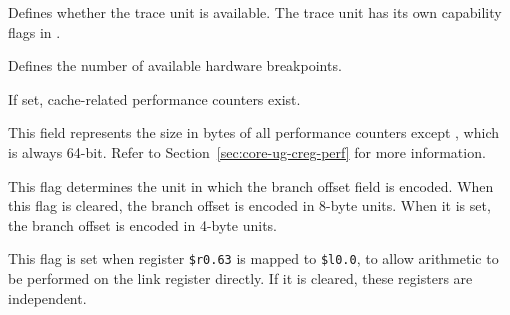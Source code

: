 \reset{***}
Defines whether the trace unit is available. The trace unit has its own
capability flags in .

\implementation{}

\reset{***}
Defines the number of available hardware breakpoints.

\implementation{}

\reset{*}
If set, cache-related performance counters exist.

\implementation{}

\reset{***}
This field represents the size in bytes of all performance counters except
, which is always 64-bit. Refer to Section~\ref{sec:core-ug-creg-perf}
for more information.

\implementation{}

\reset{*}
This flag determines the unit in which the branch offset field is encoded. When
this flag is cleared, the branch offset is encoded in 8-byte units. When it is
set, the branch offset is encoded in 4-byte units.

\implementation{}

\reset{*}
This flag is set when register \texttt{\$r0.63} is mapped to \texttt{\$l0.0}, to
allow arithmetic to be performed on the link register directly. If it is
cleared, these registers are independent.

